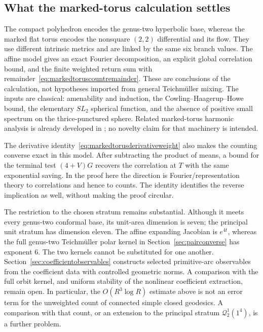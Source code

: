 \subsection{What the marked-torus calculation settles}
\label{subsec:genus2torusscope}

The compact polyhedron encodes the genus-two hyperbolic base, whereas the
marked flat torus encodes the nonsquare $(2,2)$ differential and its flow.
They use different intrinsic metrics and are linked by the same six branch
values. The affine model gives an exact Fourier decomposition, an explicit
global correlation bound, and the finite weighted return sum with
remainder~\eqref{eq:markedtoruscountremainder}. These are conclusions of the
calculation, not hypotheses imported from general Teichm\"uller mixing.
The inputs are classical: amenability and induction, the
Cowling--Haagerup--Howe bound, the elementary $SL_2$ spherical function,
and the absence of positive small spectrum on the thrice-punctured sphere.
Related marked-torus harmonic analysis is already developed in
\cite{StrombergssonVishe,AthreyaLagaceMollerRaum}; no novelty claim for that
machinery is intended.

The derivative identity~\eqref{eq:markedtorusderivativeweight} also makes
the counting converse exact in this model. After subtracting the product
of means, a bound for the terminal test $(4+V)G$ recovers the correlation
at $T$ with the same exponential saving. In the proof here the direction
is Fourier/representation theory to correlations and hence to counts.
The identity identifies the reverse implication as well, without making
the proof circular.

The restriction to the chosen stratum remains substantial. Although it
meets every genus-two conformal base, its unit-area dimension is seven;
the principal unit stratum has dimension eleven. The affine expanding
Jacobian is $e^{4t}$, whereas the full genus-two Teichm\"uller polar kernel
in Section~\ref{sec:pairconverse} has exponent $6$. The two kernels cannot
be substituted for one another. Section~\ref{sec:coefficientobservables}
constructs selected primitive-arc observables from the coefficient data
with controlled geometric norms. A comparison with the full orbit kernel,
and uniform stability of the nonlinear coefficient extraction, remain
open. In particular, the $O(R^3\log R)$ estimate above is not an error
term for the unweighted count of connected simple closed geodesics.
A comparison with that count, or an extension to the principal stratum
$\mathcal Q^1_2(1^4)$, is a further problem.



